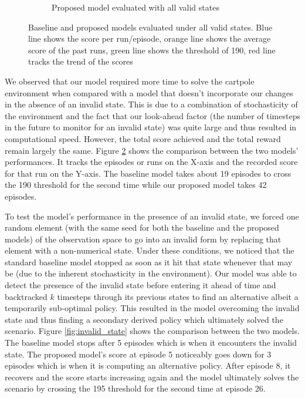 \documentclass[acmsmall,review,authorversion]{acmart}
\begin{document}
\begin{figure}[thb]
\begin{subfigure}{.5\textwidth}
          \caption{Proposed model evaluated with all valid states}
          \label{fig:proposed_valid}
        \end{subfigure}
        \captionsetup{justification=centering}
        \caption{Baseline and proposed models evaluated under all valid states. Blue line shows the score per run/episode, orange line shows the average score of the past runs, green line shows the threshold of 190, red line tracks the trend of the scores}
        \label{fig:valid_states}
    \end{figure}
    
We observed that our model required more time to solve the cartpole environment when compared with a model that doesn't incorporate our changes in the absence of an invalid state. This is due to a combination of stochasticity of the environment and the fact that our look-ahead factor (the number of timesteps in the future to monitor for an invalid state) was quite large and thus resulted in computational speed. However, the total score achieved and the total reward remain largely the same. Figure \ref{fig:valid_states} shows the comparison between the two models' performances. It tracks the episodes or runs on the X-axis and the recorded score for that run on the Y-axis. The baseline model takes about 19 episodes to cross the 190 threshold for the second time while our proposed model takes 42 episodes. 
    
To test the model's performance in the presence of an invalid state, we forced one random element (with the same seed for both the baseline and the proposed models) of the observation space to go into an invalid form by replacing that element with a non-numerical state. Under these conditions, we noticed that the standard baseline model stopped as soon as it hit that state whenever that may be (due to the inherent stochasticity in the environment). Our model was able to detect the presence of the invalid state before entering it ahead of time and backtracked $k$ timesteps through its previous states to find an alternative albeit a temporarily sub-optimal policy. This resulted in the model overcoming the invalid state and thus finding a secondary derived policy which ultimately solved the scenario. Figure \ref{fig:invalid_state} shows the comparison between the two models. The baseline model stops after 5 episodes which is when it encounters the invalid state. The proposed model's score at episode 5 noticeably goes down for 3 episodes which is when it is computing an alternative policy. After episode 8, it recovers and the score starts increasing again and the model ultimately solves the scenario by crossing the 195 threshold for the second time at episode 26.
\end{document}
